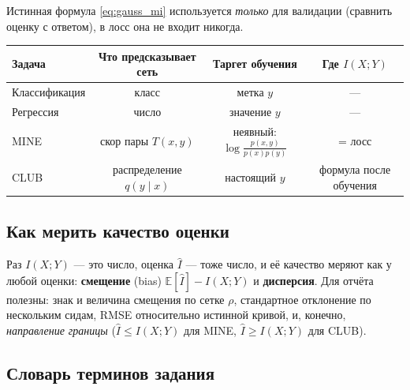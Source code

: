 \documentclass[11pt]{article}
\newcommand{\MI}{I(X;Y)}
\newcommand{\EE}{\mathbb{E}}
\begin{document}
Истинная формула \eqref{eq:gauss_mi} используется \emph{только} для валидации (сравнить оценку с ответом), в лосс она не входит никогда.

\begin{center}
\small
\begin{tabular}{@{}lccc@{}}
\toprule
Задача & Что предсказывает сеть & Таргет обучения & Где $\MI$ \\
\midrule
Классификация & класс & метка $y$ & — \\
Регрессия & число & значение $y$ & — \\
MINE & скор пары $T(x,y)$ & неявный: $\log\frac{p(x,y)}{p(x)p(y)}$ & = лосс \\
CLUB & распределение $q(y\mid x)$ & настоящий $y$ & формула после обучения \\
\bottomrule
\end{tabular}
\end{center}

\subsection{Как мерить качество оценки}

Раз $\MI$ — это число, оценка $\hat I$ — тоже число, и её качество меряют как у любой оценки: \textbf{смещение} (bias) $\EE[\hat I]-\MI$ и \textbf{дисперсия}. Для отчёта полезны: знак и величина смещения по сетке $\rho$, стандартное отклонение по нескольким сидам, RMSE относительно истинной кривой, и, конечно, \emph{направление границы} ($\hat I\le \MI$ для MINE, $\hat I\ge \MI$ для CLUB).

\subsection{Словарь терминов задания}
\end{document}
